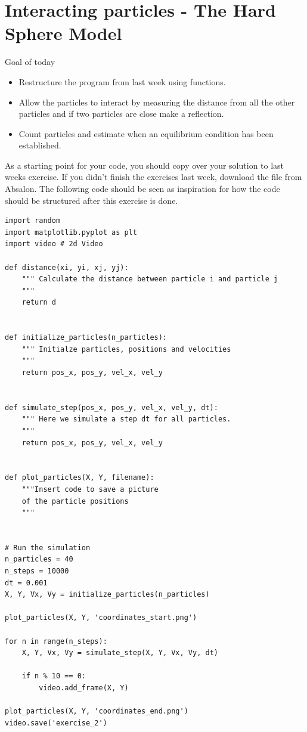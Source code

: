 \documentclass{article}
\begin{document}
\newpage
\section{Interacting particles - The Hard Sphere Model}

Goal of today

\begin{itemize}
  \item Restructure the program from last week using functions.
  \item Allow the particles to interact by measuring the distance from all the other particles
    and if two particles are close make a reflection.
  \item Count particles and estimate when an equilibrium condition has been established.
\end{itemize}

As a starting point for your code, you should copy over your solution to last
weeks exercise. If you didn't finish the exercises last week, download the file
 from Absalon. The following code should be seen as
inspiration for how the code should be structured after this exercise is done.

\begin{lstlisting}
import random
import matplotlib.pyplot as plt
import video # 2d Video

def distance(xi, yi, xj, yj):
    """ Calculate the distance between particle i and particle j
    """
    return d


def initialize_particles(n_particles):
    """ Initialze particles, positions and velocities
    """
    return pos_x, pos_y, vel_x, vel_y


def simulate_step(pos_x, pos_y, vel_x, vel_y, dt):
    """ Here we simulate a step dt for all particles.
    """
    return pos_x, pos_y, vel_x, vel_y


def plot_particles(X, Y, filename):
    """Insert code to save a picture
    of the particle positions
    """


# Run the simulation
n_particles = 40
n_steps = 10000
dt = 0.001
X, Y, Vx, Vy = initialize_particles(n_particles)

plot_particles(X, Y, 'coordinates_start.png')

for n in range(n_steps):
    X, Y, Vx, Vy = simulate_step(X, Y, Vx, Vy, dt)

    if n % 10 == 0:
        video.add_frame(X, Y)

plot_particles(X, Y, 'coordinates_end.png')
video.save('exercise_2')

\end{lstlisting}
\end{document}
